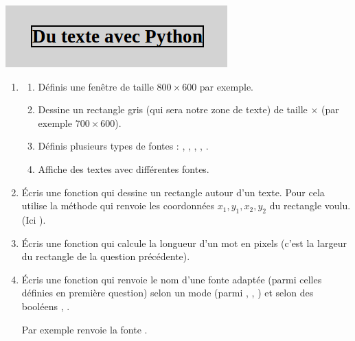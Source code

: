 \documentclass[11pt,class=report,crop=false]{standalone}
\begin{document}
\begin{activite}


\begin{center}
\includegraphics[scale=0.6]{ecran-markdown-2}
\end{center}

\begin{enumerate}
  \item 
  \begin{enumerate}
    \item Définis une fenêtre  de taille $800 \times 600$ par exemple.

    \item Dessine un rectangle gris (qui sera notre zone de texte) de taille  $\times$  (par exemple $700 \times 600$).

    \item Définis plusieurs types de fontes : , , , , .
    
    \item Affiche des textes avec différentes fontes.
  \end{enumerate}
    
  \item Écris une fonction  qui dessine un rectangle autour d'un texte. Pour cela utilise la méthode  qui renvoie les coordonnées $x_1,y_1,x_2,y_2$ du rectangle voulu. (Ici ).
  
  \item Écris une fonction  qui calcule la longueur d'un mot en pixels (c'est la largeur du rectangle de la question précédente).
  
  \item Écris une fonction  qui renvoie le nom d'une fonte adaptée (parmi celles définies en première question) selon un mode (parmi , , ) et selon des booléens , .
  
  Par exemple  renvoie la fonte .
\end{enumerate}

\end{activite}
\end{document}
